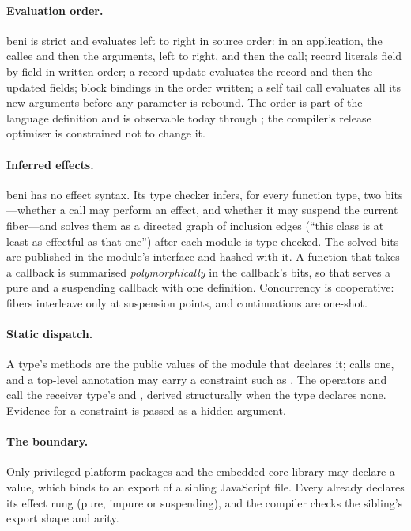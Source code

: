 \paragraph{Evaluation order.} beni is strict and evaluates left to right in source order: in an
application, the callee and then the arguments, left to right, and then the call; record literals
field by field in written order; a record update evaluates the record and then the updated fields;
block bindings in the order written; a self tail call evaluates all its new arguments before any
parameter is rebound. The order is part of the language definition and is observable today through
; the compiler's release optimiser is constrained not to change it.

\paragraph{Inferred effects.} beni has no effect syntax. Its type checker infers, for every function
type, two bits---whether a call may perform an effect, and whether it may suspend the current
fiber---and solves them as a directed graph of inclusion edges (``this class is at least as
effectful as that one'') after each module is type-checked. The solved bits are published in the
module's interface and hashed with it. A function that takes a callback is summarised
\emph{polymorphically} in the callback's bits, so that  serves a pure and a
suspending callback with one definition. Concurrency is cooperative: fibers interleave only at
suspension points, and continuations are one-shot.

\paragraph{Static dispatch.} A type's methods are the public values of the module that declares
it;  calls one, and a top-level annotation may carry a constraint such as
. The operators \code{==} and \code{<} call the receiver type's
 and , derived structurally when the type declares none. Evidence for a
constraint is passed as a hidden argument.

\paragraph{The boundary.} Only privileged platform packages and the embedded core library may
declare a  value, which binds to an export of a sibling JavaScript file. Every
 already declares its effect rung (pure, impure or suspending), and the compiler
checks the sibling's export shape and arity.

